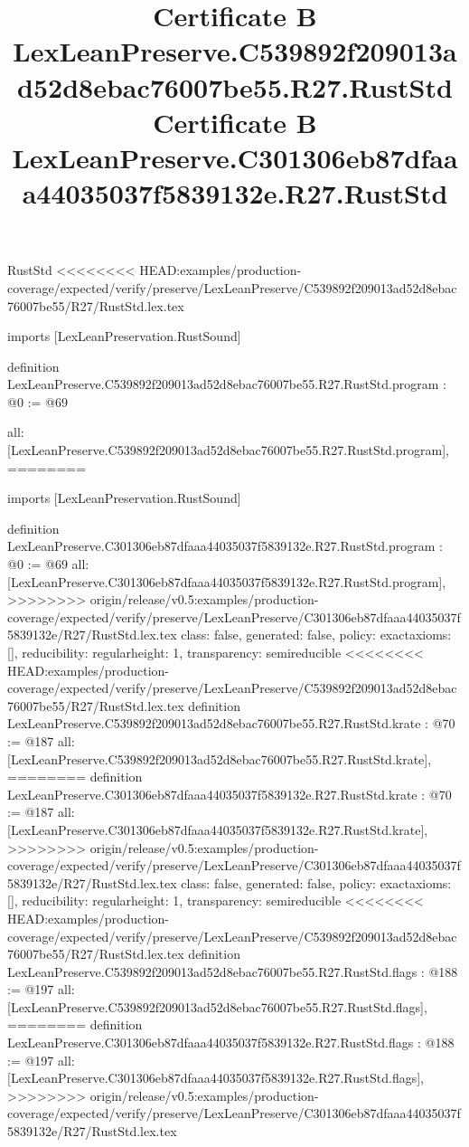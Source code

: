 \begin{lexlean}{RustStd}
<<<<<<<< HEAD:examples/production-coverage/expected/verify/preserve/LexLeanPreserve/C539892f209013ad52d8ebac76007be55/R27/RustStd.lex.tex
\title{Certificate B LexLeanPreserve.C539892f209013ad52d8ebac76007be55.R27.RustStd}
\begin{coremodule}
imports [LexLeanPreservation.RustSound]

definition LexLeanPreserve.C539892f209013ad52d8ebac76007be55.R27.RustStd.program : @0 := @69 {
  all: [LexLeanPreserve.C539892f209013ad52d8ebac76007be55.R27.RustStd.program],
========
\title{Certificate B LexLeanPreserve.C301306eb87dfaaa44035037f5839132e.R27.RustStd}
\begin{coremodule}
imports [LexLeanPreservation.RustSound]

definition LexLeanPreserve.C301306eb87dfaaa44035037f5839132e.R27.RustStd.program : @0 := @69 {
  all: [LexLeanPreserve.C301306eb87dfaaa44035037f5839132e.R27.RustStd.program],
>>>>>>>> origin/release/v0.5:examples/production-coverage/expected/verify/preserve/LexLeanPreserve/C301306eb87dfaaa44035037f5839132e/R27/RustStd.lex.tex
  class: false,
  generated: false,
  policy: exact{axioms: []},
  reducibility: regular{height: 1},
  transparency: semireducible
}
<<<<<<<< HEAD:examples/production-coverage/expected/verify/preserve/LexLeanPreserve/C539892f209013ad52d8ebac76007be55/R27/RustStd.lex.tex
definition LexLeanPreserve.C539892f209013ad52d8ebac76007be55.R27.RustStd.krate : @70 := @187 {
  all: [LexLeanPreserve.C539892f209013ad52d8ebac76007be55.R27.RustStd.krate],
========
definition LexLeanPreserve.C301306eb87dfaaa44035037f5839132e.R27.RustStd.krate : @70 := @187 {
  all: [LexLeanPreserve.C301306eb87dfaaa44035037f5839132e.R27.RustStd.krate],
>>>>>>>> origin/release/v0.5:examples/production-coverage/expected/verify/preserve/LexLeanPreserve/C301306eb87dfaaa44035037f5839132e/R27/RustStd.lex.tex
  class: false,
  generated: false,
  policy: exact{axioms: []},
  reducibility: regular{height: 1},
  transparency: semireducible
}
<<<<<<<< HEAD:examples/production-coverage/expected/verify/preserve/LexLeanPreserve/C539892f209013ad52d8ebac76007be55/R27/RustStd.lex.tex
definition LexLeanPreserve.C539892f209013ad52d8ebac76007be55.R27.RustStd.flags : @188 := @197 {
  all: [LexLeanPreserve.C539892f209013ad52d8ebac76007be55.R27.RustStd.flags],
========
definition LexLeanPreserve.C301306eb87dfaaa44035037f5839132e.R27.RustStd.flags : @188 := @197 {
  all: [LexLeanPreserve.C301306eb87dfaaa44035037f5839132e.R27.RustStd.flags],
>>>>>>>> origin/release/v0.5:examples/production-coverage/expected/verify/preserve/LexLeanPreserve/C301306eb87dfaaa44035037f5839132e/R27/RustStd.lex.tex
}}}
\end{coremodule}}
\end{coremodule}
\end{lexlean}
